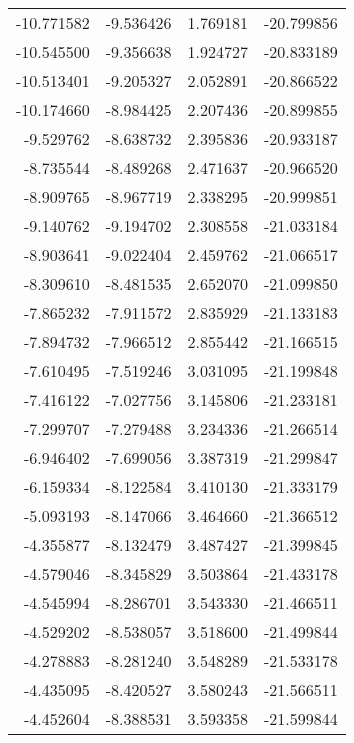 \begin{tabular}{rrrr}
      -10.771582 &        -9.536426 &    1.769181 & -20.799856 \\
      -10.545500 &        -9.356638 &    1.924727 & -20.833189 \\
      -10.513401 &        -9.205327 &    2.052891 & -20.866522 \\
      -10.174660 &        -8.984425 &    2.207436 & -20.899855 \\
       -9.529762 &        -8.638732 &    2.395836 & -20.933187 \\
       -8.735544 &        -8.489268 &    2.471637 & -20.966520 \\
       -8.909765 &        -8.967719 &    2.338295 & -20.999851 \\
       -9.140762 &        -9.194702 &    2.308558 & -21.033184 \\
       -8.903641 &        -9.022404 &    2.459762 & -21.066517 \\
       -8.309610 &        -8.481535 &    2.652070 & -21.099850 \\
       -7.865232 &        -7.911572 &    2.835929 & -21.133183 \\
       -7.894732 &        -7.966512 &    2.855442 & -21.166515 \\
       -7.610495 &        -7.519246 &    3.031095 & -21.199848 \\
       -7.416122 &        -7.027756 &    3.145806 & -21.233181 \\
       -7.299707 &        -7.279488 &    3.234336 & -21.266514 \\
       -6.946402 &        -7.699056 &    3.387319 & -21.299847 \\
       -6.159334 &        -8.122584 &    3.410130 & -21.333179 \\
       -5.093193 &        -8.147066 &    3.464660 & -21.366512 \\
       -4.355877 &        -8.132479 &    3.487427 & -21.399845 \\
       -4.579046 &        -8.345829 &    3.503864 & -21.433178 \\
       -4.545994 &        -8.286701 &    3.543330 & -21.466511 \\
       -4.529202 &        -8.538057 &    3.518600 & -21.499844 \\
       -4.278883 &        -8.281240 &    3.548289 & -21.533178 \\
       -4.435095 &        -8.420527 &    3.580243 & -21.566511 \\
       -4.452604 &        -8.388531 &    3.593358 & -21.599844 \\

\end{tabular}
